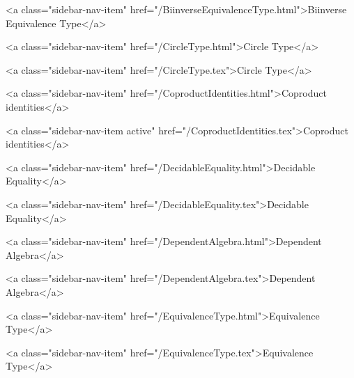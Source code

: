       
        
          <a class="sidebar-nav-item" href="/BiinverseEquivalenceType.html">Biinverse Equivalence Type</a>
        
      
    
      
        
          <a class="sidebar-nav-item" href="/CircleType.html">Circle Type</a>
        
      
    
      
        
          <a class="sidebar-nav-item" href="/CircleType.tex">Circle Type</a>
        
      
    
      
        
          <a class="sidebar-nav-item" href="/CoproductIdentities.html">Coproduct identities</a>
        
      
    
      
        
          <a class="sidebar-nav-item active" href="/CoproductIdentities.tex">Coproduct identities</a>
        
      
    
      
        
          <a class="sidebar-nav-item" href="/DecidableEquality.html">Decidable Equality</a>
        
      
    
      
        
          <a class="sidebar-nav-item" href="/DecidableEquality.tex">Decidable Equality</a>
        
      
    
      
        
          <a class="sidebar-nav-item" href="/DependentAlgebra.html">Dependent Algebra</a>
        
      
    
      
        
          <a class="sidebar-nav-item" href="/DependentAlgebra.tex">Dependent Algebra</a>
        
      
    
      
        
          <a class="sidebar-nav-item" href="/EquivalenceType.html">Equivalence Type</a>
        
      
    
      
        
          <a class="sidebar-nav-item" href="/EquivalenceType.tex">Equivalence Type</a>
        

